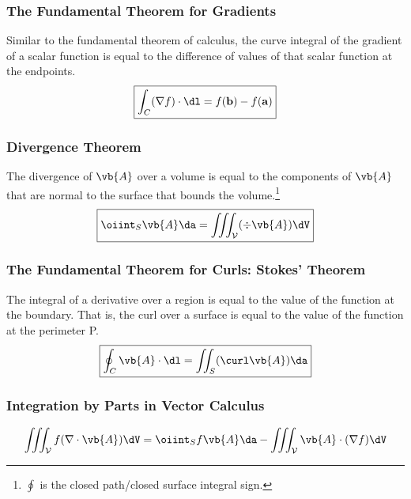     \subsubsection*{The Fundamental Theorem for Gradients}
        Similar to the fundamental theorem of calculus, the curve integral of the gradient of a scalar function is equal to the difference of values of that scalar function at the endpoints. 
        \begin{equation}
            \boxed{\int_C(\nabla f)\cdot\dl=f(\mathbf{b})-f(\mathbf{a})}
        \end{equation}
    \subsubsection*{Divergence Theorem}
        The divergence of \(\vb{A}\) over a volume is equal to the components of \(\vb{A}\) that are normal to the surface that bounds the volume.\footnote{\(\oint\) is the closed path/closed surface integral sign.}
        \begin{align}
            \boxed{\oiint_S \vb{A} \da =\iiint_{\mathcal{V}} (\div\vb{A})\dV } 
        \end{align}
    \subsubsection*{The Fundamental Theorem for Curls: Stokes' Theorem}
        The integral of a derivative over a region is equal to the value of the function at the boundary. That is, the curl over a surface is equal to the value of the function at the perimeter P. 
        \begin{align}
            \boxed{\oint_C \vb{A}\cdot\dl=\iint_{S} (\curl \vb{A}) \da} 
        \end{align}
        \subsubsection*{Integration by Parts in Vector Calculus}
        \begin{align*}
        \iiint_{\mathcal{V}} f(\nabla \cdot \vb{A})\dV 
        =
        \oiint_S f\vb{A}\da
        -\iiint_{\mathcal{V}} \vb{A} \cdot (\nabla f)\dV 
        \end{align*}


        \newpage

